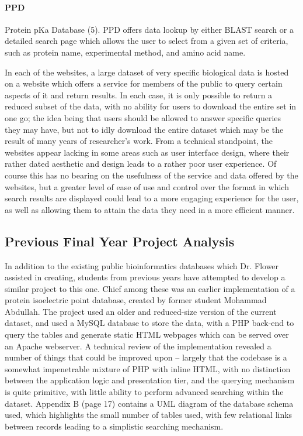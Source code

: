 \documentclass[12pt,a4paper]{article}
\begin{document}
\paragraph{PPD} Protein pKa Database (5). PPD offers data lookup by either
BLAST search or a detailed search page which allows the user to select from a
given set of criteria, such as protein name, experimental method, and amino acid
name.

In each of the websites, a large dataset of very specific biological data is
hosted on a website which offers a service for members of the public to query
certain aspects of it and return results. In each case, it is only possible to
return a reduced subset of the data, with no ability for users to download the
entire set in one go; the idea being that users should be allowed to answer
specific queries they may have, but not to idly download the entire dataset
which may be the result of many years of researcher's work. From a technical
standpoint, the websites appear lacking in some areas such as user interface
design, where their rather dated aesthetic and design leads to a rather poor
user experience. Of course this has no bearing on the usefulness of the service
and data offered by the websites, but a greater level of ease of use and control
over the format in which search results are displayed could lead to a more
engaging experience for the user, as well as allowing them to attain the data
they need in a more efficient manner.

\subsection{Previous Final Year Project Analysis}

In addition to the existing public bioinformatics databases which Dr. Flower
assisted in creating, students from previous years have attempted to develop a
similar project to this one. Chief among these was an earlier implementation of
a protein isoelectric point database, created by former student Mohammad
Abdullah. The project used an older and reduced-size version of the current
dataset, and used a MySQL database to store the data, with a PHP back-end to
query the tables and generate static HTML webpages which can be served over an
Apache webserver. A technical review of the implementation revealed a number of
things that could be improved upon – largely that the codebase is a somewhat
impenetrable mixture of PHP with inline HTML, with no distinction between the
application logic and presentation tier, and the querying mechanism is quite
primitive, with little ability to perform advanced searching within the
dataset. Appendix B (page 17) contains a UML diagram of the database schema
used, which highlights the small number of tables used, with few relational
links between records leading to a simplistic searching mechanism.
\end{document}
